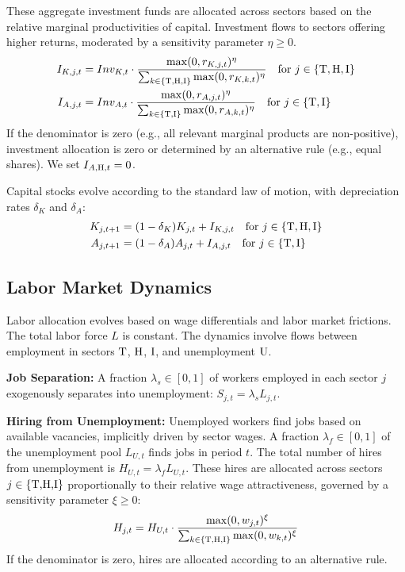 \documentclass{article}
\newcommand{\sector}[1]{\textnormal{#1}}
\begin{document}
These aggregate investment funds are allocated across sectors based on the relative marginal productivities of capital. 
Investment flows to sectors offering higher returns, moderated by a sensitivity parameter $\eta \geq 0$.
\begin{align}
I_{K,j,t} &= Inv_{K,t} \cdot \frac{ \max(0, r_{K,j,t})^\eta }{ \sum_{k \in \{\sector{T,H,I}\}} \max(0, r_{K,k,t})^\eta } \quad \text{for } j \in \{\sector{T}, \sector{H}, \sector{I}\} \label{eq:inv_alloc_K} \\
I_{A,j,t} &= Inv_{A,t} \cdot \frac{ \max(0, r_{A,j,t})^\eta }{ \sum_{k \in \{\sector{T,I}\}} \max(0, r_{A,k,t})^\eta } \quad \text{for } j \in \{\sector{T}, \sector{I}\} \label{eq:inv_alloc_A}
\end{align}
If the denominator is zero (e.g., all relevant marginal products are non-positive), investment allocation is zero or determined by an alternative rule (e.g., equal shares). We set $I_{A,\sector{H},t} = 0$.

Capital stocks evolve according to the standard law of motion, with depreciation rates $\delta_K$ and $\delta_A$:
\begin{align}
K_{j,t+1} &= (1 - \delta_K) K_{j,t} + I_{K,j,t} \quad \text{for } j \in \{\sector{T}, \sector{H}, \sector{I}\} \label{eq:k_accum} \\
A_{j,t+1} &= (1 - \delta_A) A_{j,t} + I_{A,j,t} \quad \text{for } j \in \{\sector{T}, \sector{I}\} \label{eq:a_accum}
\end{align}

\subsection{Labor Market Dynamics}
Labor allocation evolves based on wage differentials and labor market frictions. 
The total labor force $L$ is constant. 
The dynamics involve flows between employment in sectors $\sector{T}$, $\sector{H}$, $\sector{I}$, and unemployment $\sector{U}$.

\noindent
\textbf{Job Separation:} A fraction $\lambda_s \in [0,1]$ of workers employed in each sector $j$ exogenously separates into unemployment: $S_{j,t} = \lambda_s L_{j,t}$.

\noindent
\textbf{Hiring from Unemployment:} Unemployed workers find jobs based on available vacancies, implicitly driven by sector wages. 
A fraction $\lambda_f \in [0,1]$ of the unemployment pool $L_{U,t}$ finds jobs in period $t$. 
The total number of hires from unemployment is $H_{U,t} = \lambda_f L_{U,t}$. 
These hires are allocated across sectors $j \in \{\sector{T,H,I}\}$ proportionally to their relative wage attractiveness, governed by a sensitivity parameter $\xi \geq 0$:
\begin{equation}
    H_{j,t} = H_{U,t} \cdot \frac{ \max(0, w_{j,t})^\xi }{ \sum_{k \in \{\sector{T,H,I}\}} \max(0, w_{k,t})^\xi } \label{eq:labor_hire}
\end{equation}
If the denominator is zero, hires are allocated according to an alternative rule.
\end{document}

